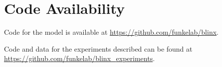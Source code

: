 \section{Code Availability}
Code for the model \ours is available at \href{https://github.com/funkelab/blinx}{https://github.com/funkelab/blinx}.

Code and data for the experiments described can be found at 
\href{https://github.com/funkelab/blinx{\_}experiments}{https://github.com/funkelab/blinx{\_}experiments}.
